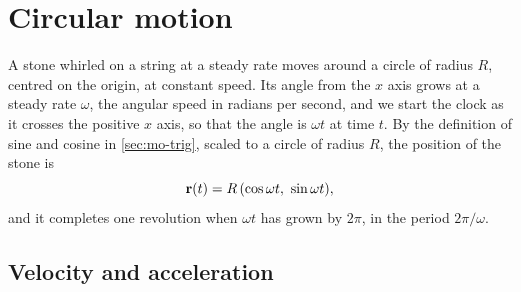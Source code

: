 \section{Circular motion}
\label{sec:mo-circle}

A stone whirled on a string at a steady rate moves around a circle of
radius $R$, centred on the origin, at constant speed. Its angle from the
$x$ axis grows at a steady rate $\omega$, the angular speed in radians
per second, and we start the clock as it crosses the positive $x$ axis,
so that the angle is $\omega t$ at time $t$. By the definition of sine and cosine in
\cref{sec:mo-trig}, scaled to a circle of radius $R$, the position of the
stone is
\begin{equation*}
   \bm{\mathrm{r}}(t) = R\,(\cos\omega t,\ \sin\omega t) ,
\end{equation*}
and it completes one revolution when $\omega t$ has grown by $2\pi$, in
the period $2\pi/\omega$.

\subsection*{Velocity and acceleration}

